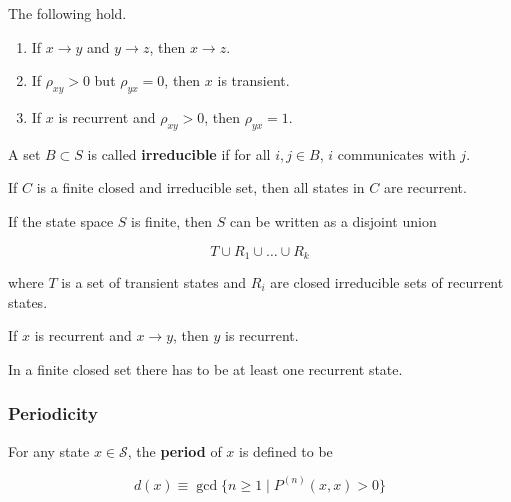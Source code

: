 \documentclass{article}
\begin{document}
      \begin{lemma}
        The following hold. 

        \begin{enumerate}
          \item If $x \rightarrow y$ and $y \rightarrow z$, then $x \rightarrow z$. 
          \item If $\rho_{xy} > 0$ but $\rho_{yx} = 0$, then $x$ is transient.  
          \item If $x$ is recurrent and $\rho_{xy} > 0$, then $\rho_{yx} = 1$. 
        \end{enumerate}
      \end{lemma}

      \begin{definition}
        A set $B \subset S$ is called \textbf{irreducible} if for all $i, j \in B$, $i$ communicates with $j$. 
      \end{definition}

      \begin{theorem}
        If $C$ is a finite closed and irreducible set, then all states in $C$ are recurrent. 
      \end{theorem}

      \begin{theorem}[Decomposition]
        If the state space $S$ is finite, then $S$ can be written as a disjoint union 

          \[T \cup R_1 \cup \ldots \cup R_k\]

        where $T$ is a set of transient states and $R_i$ are closed irreducible sets of recurrent states. 
      \end{theorem}

      \begin{lemma}
        If $x$ is recurrent and $x \rightarrow y$, then $y$ is recurrent. 
      \end{lemma}

      \begin{lemma}
        In a finite closed set there has to be at least one recurrent state. 
      \end{lemma}

    \subsubsection{Periodicity}

      \begin{definition}[Period]
        For any state $x \in \mathcal{S}$, the \textbf{period} of $x$ is defined to be

          \[d(x) \equiv \gcd \{n \geq 1 \; | \; P^{(n)} (x, x) > 0\}\]
      \end{definition}
\end{document}
